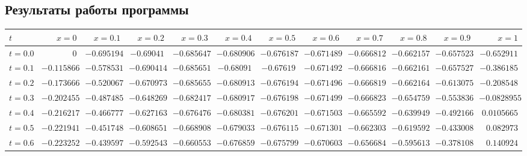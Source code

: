 \subsection{Результаты работы программы}

\begin{table}[h!]
	\scriptsize
	\hspace{-10em}
	\begin{tabular}{|l|rrrrrrrrrrr|}
		\hline
		$t$          & $x=0$             & $x=0.1$           & $x=0.2$           & $x=0.3$           & $x=0.4$           & $x=0.5$           & $x=0.6$           & $x=0.7$           & $x=0.8$           & $x=0.9$           & $x=1$             \\
		\hline
		$   t = 0.0$ & $              0$ & $      -0.695194$ & $       -0.69041$ & $      -0.685647$ & $      -0.680906$ & $      -0.676187$ & $      -0.671489$ & $      -0.666812$ & $      -0.662157$ & $      -0.657523$ & $      -0.652911$ \\
		$   t = 0.1$ & $      -0.115866$ & $      -0.578531$ & $      -0.690414$ & $      -0.685651$ & $       -0.68091$ & $       -0.67619$ & $      -0.671492$ & $      -0.666816$ & $      -0.662161$ & $      -0.657527$ & $      -0.386185$ \\
		$   t = 0.2$ & $      -0.173666$ & $      -0.520067$ & $      -0.670973$ & $      -0.685655$ & $      -0.680913$ & $      -0.676194$ & $      -0.671496$ & $      -0.666819$ & $      -0.662164$ & $      -0.613075$ & $      -0.208548$ \\
		$   t = 0.3$ & $      -0.202455$ & $      -0.487485$ & $      -0.648269$ & $      -0.682417$ & $      -0.680917$ & $      -0.676198$ & $      -0.671499$ & $      -0.666823$ & $      -0.654759$ & $      -0.553836$ & $     -0.0828955$ \\
		$   t = 0.4$ & $      -0.216217$ & $      -0.466777$ & $      -0.627163$ & $      -0.676476$ & $      -0.680381$ & $      -0.676201$ & $      -0.671503$ & $      -0.665592$ & $      -0.639949$ & $      -0.492166$ & $      0.0105665$ \\
		$   t = 0.5$ & $      -0.221941$ & $      -0.451748$ & $      -0.608651$ & $      -0.668908$ & $      -0.679033$ & $      -0.676115$ & $      -0.671301$ & $      -0.662303$ & $      -0.619592$ & $      -0.433008$ & $       0.082973$ \\
		$   t = 0.6$ & $      -0.223252$ & $      -0.439597$ & $      -0.592543$ & $      -0.660553$ & $      -0.676859$ & $      -0.675799$ & $      -0.670603$ & $      -0.656684$ & $      -0.595613$ & $      -0.378108$ & $       0.140924$ \\

\end{tabular}
\end{table}
